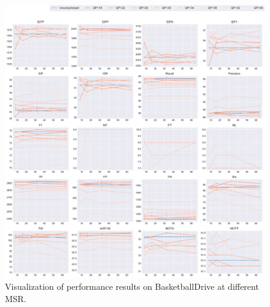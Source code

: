 \begin{figure}[!htbp]
\centering
\includegraphics[width=1.0\linewidth]{img/appendix/BasketballDrive_all_multiplots_msr.pdf}
\caption[Visualization of performance results on BasketballDrive at different MSR]
{Visualization of performance results on BasketballDrive at different MSR.}
\label{fig:BasketballDrive_all_msr}
\end{figure}



